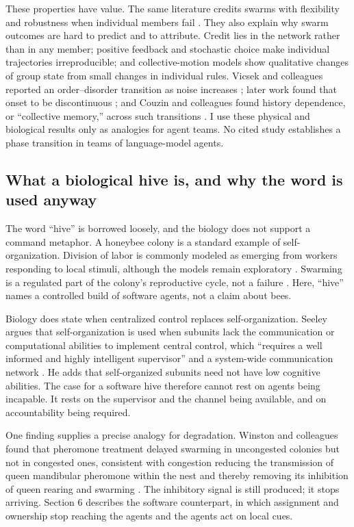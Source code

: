 \documentclass[11pt]{article}
\begin{document}
These properties have value. The same literature credits swarms with flexibility and robustness when individual members fail \cite{bonabeau1999}. They also explain why swarm outcomes are hard to predict and to attribute. Credit lies in the network rather than in any member; positive feedback and stochastic choice make individual trajectories irreproducible; and collective-motion models show qualitative changes of group state from small changes in individual rules. Vicsek and colleagues reported an order--disorder transition as noise increases \cite{vicsek1995}; later work found that onset to be discontinuous \cite{gregoire2004}; and Couzin and colleagues found history dependence, or ``collective memory,'' across such transitions \cite{couzin2002}. I use these physical and biological results only as analogies for agent teams. No cited study establishes a phase transition in teams of language-model agents.

\subsection{What a biological hive is, and why the word is used anyway}

The word ``hive'' is borrowed loosely, and the biology does not support a command metaphor. A honeybee colony is a standard example of self-organization. Division of labor is commonly modeled as emerging from workers responding to local stimuli, although the models remain exploratory \cite{beshers2001,duarte2012}. Swarming is a regulated part of the colony's reproductive cycle, not a failure \cite{winston1987,seeley2010}. Here, ``hive'' names a controlled build of software agents, not a claim about bees.

Biology does state when centralized control replaces self-organization. Seeley argues that self-organization is used when subunits lack the communication or computational abilities to implement central control, which ``requires a well informed and highly intelligent supervisor'' and a system-wide communication network \cite{seeley2002}. He adds that self-organized subunits need not have low cognitive abilities. The case for a software hive therefore cannot rest on agents being incapable. It rests on the supervisor and the channel being available, and on accountability being required.

One finding supplies a precise analogy for degradation. Winston and colleagues found that pheromone treatment delayed swarming in uncongested colonies but not in congested ones, consistent with congestion reducing the transmission of queen mandibular pheromone within the nest and thereby removing its inhibition of queen rearing and swarming \cite{winston1991}. The inhibitory signal is still produced; it stops arriving. Section 6 describes the software counterpart, in which assignment and ownership stop reaching the agents and the agents act on local cues.
\end{document}
